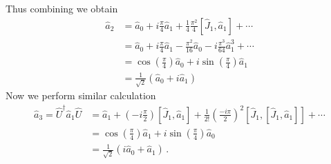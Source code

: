 \documentclass[11pt, oneside]{book}
\theoremstyle{break}
\theoremstyle{break}
\begin{document}
Thus combining we obtain
\begin{align*}
\hat{a}_2 &= \hat{a}_0 +  i\frac{\pi}{4}\hat{a}_1 + \frac{1}{4}\frac{\pi^2}{4}[\hat{J}_1,\hat{a}_1]+ \cdots\\
&= \hat{a}_0 + i\frac{\pi}{4}\hat{a}_1 - \frac{\pi^2}{16}\hat{a}_0- i\frac{\pi^3}{64}\hat{a}_1^3+\cdots\\
&= \cos\left(\frac{\pi}{4}\right) \hat{a}_0 + i\sin\left(\frac{\pi}{4}\right) \hat{a}_1\\
&=\frac{1}{\sqrt{2}}\left( \hat{a}_0 + i\hat{a}_1\right)
\end{align*}
Now we perform similar calculation
\begin{align*}
\hat{a}_3 = \hat{U}^\dagger \hat{a}_1 \hat{U} &=  \hat{a}_1 +\left(- i \frac{\pi}{2}\right)[\hat{J}_1, \hat{a}_1] + \frac{1}{2!}\left( \frac{-i \pi}{2}\right)^2 [\hat{J}_1, [\hat{J}_1, \hat{a}_1]]+ \cdots\\
&= \cos\left( \frac{\pi}{4}\right) \hat{a}_1 + i \sin\left( \frac{\pi}{4}\right) \hat{a}_0 \\
&= \frac{1}{\sqrt{2}}\left( i\hat{a}_ 0 + \hat{a}_1\right)\,.
\end{align*}
\end{document}
